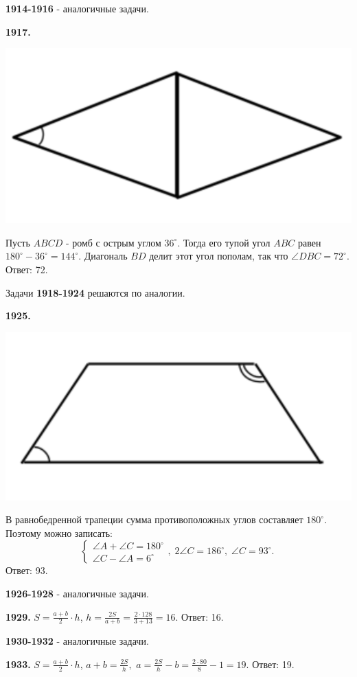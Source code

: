 \textbf{1914-1916} - аналогичные задачи.

\textbf{1917.}

{\centering \includegraphics[width=0.4\linewidth]{Geometry/Content/26.png}
	
}

Пусть $ABCD$ - ромб с острым углом $36^\circ$. Тогда его тупой угол $ABC$ равен $180^\circ - 36^\circ = 144^\circ$. Диагональ $BD$ делит этот угол пополам, так что $\angle DBC = 72^\circ.$ \newline \null \hspace*{\fill} Ответ: 72.

Задачи \textbf{1918-1924} решаются по аналогии. 

\textbf{1925.}

{\centering \includegraphics[width=0.5\linewidth]{Geometry/Content/27.png}
	
}

В равнобедренной трапеции сумма противоположных углов составляет $180^\circ$. Поэтому можно записать:
\[
\begin{cases}
	\angle A + \angle C = 180^\circ \\
	\angle C - \angle A = 6^\circ \end{cases}
, \; 2\angle C = 186^\circ, \; \angle C = 93^\circ.\;
\]\null \hspace*{\fill} Ответ: 93.

\textbf{1926-1928} - аналогичные задачи.

\textbf{1929.} $S = \frac{a + b}{2}\cdot h$, $h = \frac{2S}{a + b} = \frac{2\cdot 128}{3 + 13} = 16.$ \newline \null \hspace*{\fill} Ответ: 16.

\textbf{1930-1932} - аналогичные задачи.

\textbf{1933.} $S = \frac{a + b}{2}\cdot h$, $a + b = \frac{2S}{h},$ $a = \frac{2S}{h} - b = \frac{2\cdot 80}{8} - 1 = 19.$ \newline \null \hspace*{\fill} Ответ: 19.

